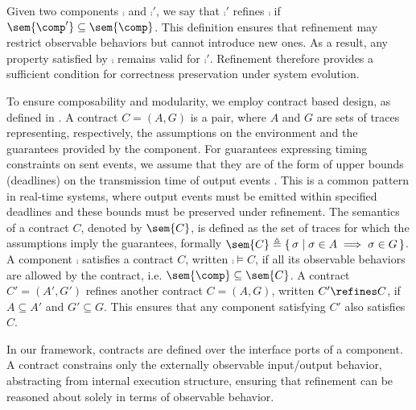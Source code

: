 Given two components $\comp$ and $\comp'$, we say that $\comp'$ {refines} $\comp$ if $\sem{\comp'} \subseteq \sem{\comp}$. This definition ensures that refinement may restrict observable behaviors but cannot introduce new ones. As a result, any property satisfied by $\comp$ remains valid for $\comp'$. Refinement therefore provides a sufficient condition for correctness preservation under system evolution.

To ensure composability and modularity, we employ contract based design, as defined in \cite{contracts}. A contract $C = (A, G)$ is a pair, where $A$ and $G$ are sets of traces representing, respectively,
the assumptions on the environment and the guarantees provided by the component. For guarantees expressing timing constraints on sent events, we assume that they are of the form of upper bounds (deadlines) on the transmission time of output events \cite{contract_based_digital_twin_2023}. This is a common pattern in real-time systems, where output events must be emitted within specified deadlines \cite{Dou02} and these bounds must be preserved under refinement.
The semantics of a contract $C$, denoted by $\sem{C}$, is defined as the set of traces for which the assumptions imply the guarantees, formally \( \sem{C} \triangleq \{\, \sigma \mid \sigma \in A \implies \sigma \in G \,\} \). 
A component $\comp$ {satisfies} a contract $C$, written $\comp \models C$, if all its observable
behaviors are allowed by the contract, i.e. $\sem{\comp} \subseteq \sem{C}$. A contract $C' = (A', G')$ refines another contract $C = (A, G)$, written $C' \refines C$, if $A \subseteq A'$ and $G' \subseteq G$. This ensures that any component satisfying $C'$ also satisfies $C$. 

In our framework, contracts are defined over the interface ports of a component. A contract constrains only the externally observable input/output behavior, abstracting from internal execution structure, ensuring that refinement can be reasoned about solely in terms of observable behavior. 

